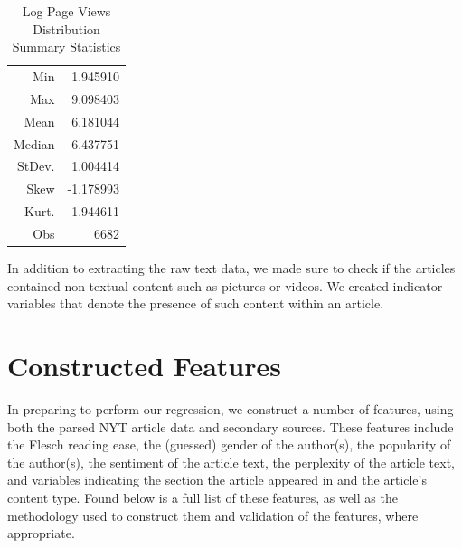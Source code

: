 \documentclass[fleqn,12pt]{SelfArx} %
\begin{document}
\begin{table}[hbt]
\caption{Log Page Views Distribution Summary Statistics}
\centering
\begin{tabular}{rr}
\toprule
Min               &  1.945910\\
Max               &  9.098403\\  
Mean              &  6.181044\\
Median            &  6.437751\\
StDev.            &  1.004414\\
Skew              &  -1.178993\\
Kurt.             &  1.944611\\
\midrule
Obs &  6682\\
\bottomrule
\end{tabular}
\end{table}

In addition to extracting the raw text data, we made sure to check if the articles contained non-textual content such as pictures or videos. We created indicator variables that denote the presence of such content within an article.



\section{Constructed Features}

In preparing to perform our regression, we construct a number of features, using both the parsed NYT article data and secondary sources. These features include the Flesch reading ease, the (guessed) gender of the author(s), the popularity of the author(s), the sentiment of the article text, the perplexity of the article text, and variables indicating the section the article appeared in and the article's content type. Found below is a full list of these features, as well as the methodology used to construct them and validation of the features, where appropriate.
\end{document}
